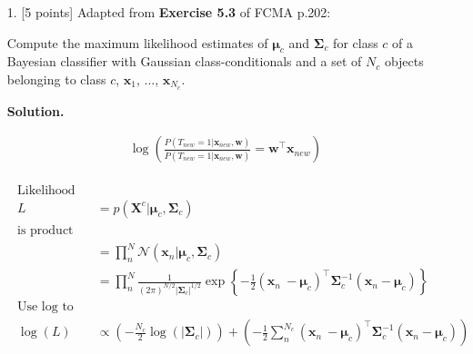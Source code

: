 \documentclass[10pt]{article}
\begin{document}
\begin{itemize}

\item[1.]  [5 points]  %
Adapted from {\bf Exercise 5.3} of FCMA p.202:

Compute the maximum likelihood estimates of $\boldsymbol{\mu}_c$ and $\boldsymbol{\Sigma}_c$ for class $c$ of a Bayesian classifier with Gaussian class-conditionals and a set of $N_c$ objects belonging to class $c$, $\mathbf{x}_1$, ..., $\mathbf{x}_{N_c}$. 

{\bf Solution.} 

\begin{eqnarray*}
\log \left( 
\frac{P(T_{new} = 1|\mathbf{x}_{new}, \mathbf{w})}{P(T_{new} = 1|\mathbf{x}_{new}, \mathbf{w})} = \mathbf{w}^\top\mathbf{x}_{new}
\right)
\end{eqnarray*}

\begin{eqnarray*}
\begin{aligned}
%
%
\text{Likelihood}
\\
L &= p(\mathbf{X}^c|\boldsymbol{\mu}_c, \boldsymbol{\Sigma}_c)
\\
\text{is product of (Gaussian) probabilities}
\\
&= \prod_n^N \mathcal{N} (\mathbf{x}_n|\boldsymbol{\mu}_c, \boldsymbol{\Sigma}_c)
\\
&= \prod_n^N 
\frac{1}{(2 \pi)^{N/2} | \boldsymbol {\Sigma}_c |^{1/2}} 
\exp 
\left\{ 
-\frac{1}{2} (\mathbf{x}_n\ - \boldsymbol {\mu}_c)^\top \boldsymbol {\Sigma}_c^{-1} (\mathbf{x}_n - \boldsymbol {\mu}_c)
\right\}
\\
% 
%
\text{Use log to handle exponent}
\\
\log(L) &\propto 
\left( - \frac{N_c}{2} \log(|\boldsymbol {\Sigma}_c|) \right)
+
\left(
-\frac{1}{2} \sum_n^{N_c} (\mathbf{x}_n\ - \boldsymbol {\mu}_c)^\top \boldsymbol {\Sigma}_c^{-1} (\mathbf{x}_n - \boldsymbol {\mu}_c)
\right)
\end{aligned}
\end{eqnarray*}


\end{itemize}
\end{document}
